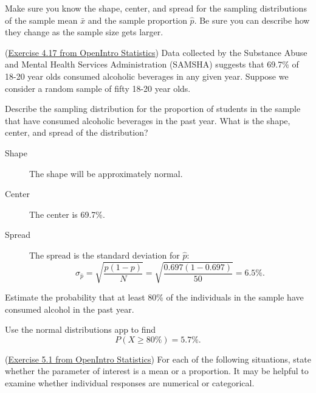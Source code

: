 \documentclass[12pt,answers]{exam}
\newcounter{countA}
\begin{document}
Make sure you know the shape, center, and spread for the sampling
distributions of the sample mean \(\bar{x}\) and the sample proportion
\(\hat{p}\). Be sure you can describe how they change as the sample size
gets larger.

\begin{questions}
\setcounter{question}{\value{countA}}

\item (\href{http://people.hsc.edu/faculty-staff/blins/books/OpenIntroStats4e.pdf\#eoce.4.17}{Exercise 4.17 from OpenIntro Statistics}) 
  Data collected by the Substance Abuse and Mental Health Services
  Administration (SAMSHA) suggests that 69.7\% of 18-20 year olds
  consumed alcoholic beverages in any given year. Suppose we consider a
  random sample of fifty 18-20 year olds.

  \begin{parts}
  \item
    Describe the sampling distribution for the proportion of students in the sample that have
    consumed alcoholic beverages in the past year. What is the shape,
    center, and spread of the distribution?
\begin{solution}
\begin{description}
\item[Shape] The shape will be approximately normal.
\item[Center] The center is 69.7\%.
\item[Spread] The spread is the standard deviation for $\hat{p}$:
$$\sigma_{\hat{p}} = \sqrt{\frac{p(1-p)}{N}} = \sqrt{\frac{0.697(1 - 0.697)}{50}} = 6.5\%.$$
\end{description}
\end{solution}
\vfill
  \item
    Estimate the probability that at least 80\% of the individuals in
    the sample have consumed alcohol in the past year.
\begin{solution}
Use the normal distributions app to find
$$P(X \ge 80\%) = 5.7\%.$$
\end{solution}
\vfill
  \end{parts}
\item
  (\href{http://people.hsc.edu/faculty-staff/blins/books/OpenIntroStats4e.pdf\#eoce.5.1}{Exercise 5.1 from OpenIntro Statistics}) For each of the following situations, state whether the
  parameter of interest is a mean or a proportion. It may be helpful to
  examine whether individual responses are numerical or categorical.


\end{questions}
\end{document}
